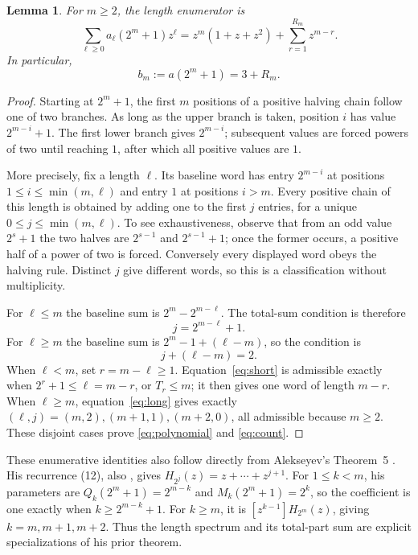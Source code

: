 \documentclass[11pt]{article}
\newtheorem{lemma}[theorem]{Lemma}
\begin{document}
\begin{lemma}\label{lem:profile}
For $m\ge2$, the length enumerator is
\begin{equation}\label{eq:polynomial}
 \sum_{\ell\ge0}a_\ell(2^m+1)z^\ell
 =z^m(1+z+z^2)+\sum_{r=1}^{R_m}z^{m-r}.
\end{equation}
In particular,
\begin{equation}\label{eq:count}
 b_m:=a(2^m+1)=3+R_m.
\end{equation}
\end{lemma}
\begin{proof}
Starting at $2^m+1$, the first $m$ positions of a positive halving chain
follow one of two branches. As long as the upper branch is taken, position
$i$ has value $2^{m-i}+1$. The first lower branch gives $2^{m-i}$;
subsequent values are forced powers of two until reaching $1$, after
which all positive values are $1$.

More precisely, fix a length $\ell$. Its baseline word has entry
$2^{m-i}$ at positions $1\le i\le\min(m,\ell)$ and entry $1$ at positions
$i>m$. Every positive chain of this length is obtained by adding one to
the first $j$ entries, for a unique
$0\le j\le\min(m,\ell)$. To see exhaustiveness, observe that from an
odd value $2^s+1$ the two halves are $2^{s-1}$ and $2^{s-1}+1$;
once the former occurs, a positive half of a power of two is forced.
Conversely every displayed word obeys the halving rule. Distinct $j$
give different words, so this is a classification without multiplicity.

For $\ell\le m$ the baseline sum is $2^m-2^{m-\ell}$. The total-sum
condition is therefore
\begin{equation}\label{eq:short}
 j=2^{m-\ell}+1.
\end{equation}
For $\ell\ge m$ the baseline sum is $2^m-1+(\ell-m)$, so the condition is
\begin{equation}\label{eq:long}
 j+(\ell-m)=2.
\end{equation}
When $\ell<m$, set $r=m-\ell\ge1$. Equation~\eqref{eq:short} is
admissible exactly when $2^r+1\le\ell=m-r$, or $T_r\le m$;
it then gives one word of length $m-r$.
When $\ell\ge m$, equation~\eqref{eq:long} gives exactly
$(\ell,j)=(m,2),(m+1,1),(m+2,0)$, all admissible because $m\ge2$.
These disjoint cases prove \eqref{eq:polynomial} and \eqref{eq:count}.
\end{proof}

These enumerative identities also follow directly from Alekseyev's
Theorem~5 \cite[pp.~5--6]{alekseyev}. His recurrence (12), also
\cite[Proposition~2.2]{mcconville}, gives
$H_{2^j}(z)=z+\cdots+z^{j+1}$. For $1\le k<m$, his parameters are
$Q_k(2^m+1)=2^{m-k}$ and $M_k(2^m+1)=2^k$, so the coefficient is one
exactly when $k\ge2^{m-k}+1$. For $k\ge m$, it is
$[z^{k-1}]H_{2^m}(z)$, giving $k=m,m+1,m+2$.
Thus the length spectrum and its total-part sum are explicit
specializations of his prior theorem.
\end{document}
